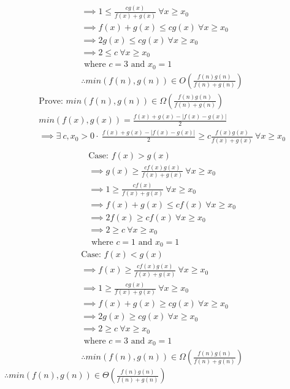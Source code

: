\documentclass[12pt]{article}
\begin{document}
\begin{enumerate}[(a)]
\begin{align*}
  &\implies 1 \leq \frac{cg(x)}{f(x) + g(x)} \ \forall x \geq x_0\\
  &\implies f(x) + g(x) \leq cg(x) \ \forall x \geq x_0\\
  &\implies 2g(x) \leq cg(x) \ \forall x \geq x_0\\
  &\implies 2 \leq c \ \forall x \geq x_0\\
  &\text{ where } c = 3 \text{ and } x_0 = 1\\
  &\therefore min(f(n), g(n)) \in O(\frac{f(n)g(n)}{f(n)+g(n)})
\end{align*}
\begin{align*}
  &\text{Prove: } min(f(n), g(n)) \in \Omega(\frac{f(n)g(n)}{f(n)+g(n)})\\
  &min(f(x),g(x)) = \frac{f(x) + g(x) - |f(x) - g(x)|}{2}\\
  &\implies \exists \  c, x_0 > 0 \cdot \  \frac{f(x) + g(x) - |f(x) - g(x)|}{2} \geq c \frac{f(x)g(x)}{f(x) + g(x)} \ \forall x \geq x_0\\
\end{align*}
\begin{align*}
  &\text{Case: } f(x) > g(x)\\
  &\implies g(x) \geq \frac{cf(x)g(x)}{f(x) + g(x)} \ \forall x \geq x_0\\
  &\implies 1 \geq \frac{cf(x)}{f(x) + g(x)} \ \forall x \geq x_0\\
  &\implies f(x) + g(x) \leq cf(x) \ \forall x \geq x_0\\
  &\implies 2f(x) \geq cf(x) \ \forall x \geq x_0\\
  &\implies 2 \geq c \ \forall x \geq x_0\\
  &\text{ where } c = 1 \text{ and } x_0 = 1
\end{align*}
\begin{align*}
  &\text{Case: } f(x) < g(x)\\
  &\implies f(x) \geq \frac{cf(x)g(x)}{f(x) + g(x)} \ \forall x \geq x_0\\
  &\implies 1 \geq \frac{cg(x)}{f(x) + g(x)} \ \forall x \geq x_0\\
  &\implies f(x) + g(x) \geq cg(x) \ \forall x \geq x_0\\
  &\implies 2g(x) \geq cg(x) \ \forall x \geq x_0\\
  &\implies 2 \geq c \ \forall x \geq x_0\\
  &\text{ where } c = 3 \text{ and } x_0 = 1\\
  &\therefore min(f(n), g(n)) \in \Omega(\frac{f(n)g(n)}{f(n)+g(n)})
\end{align*}
$\therefore min(f(n), g(n)) \in \Theta(\frac{f(n)g(n)}{f(n)+g(n)})$
  \end{enumerate}
\end{document}
